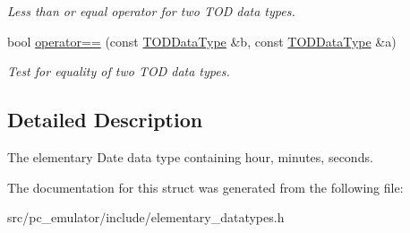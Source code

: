 \begin{DoxyCompactItemize}
\begin{DoxyCompactList}\small\item\em Less than or equal operator for two T\+OD data types. \end{DoxyCompactList}\item 
bool \hyperlink{structpc__emulator_1_1TODDataType_a5ed371ac41a465b795dfc20e05550a64}{operator==} (const \hyperlink{structpc__emulator_1_1TODDataType}{T\+O\+D\+Data\+Type} \&b, const \hyperlink{structpc__emulator_1_1TODDataType}{T\+O\+D\+Data\+Type} \&a)\hypertarget{structpc__emulator_1_1TODDataType_a5ed371ac41a465b795dfc20e05550a64}{}\label{structpc__emulator_1_1TODDataType_a5ed371ac41a465b795dfc20e05550a64}

\begin{DoxyCompactList}\small\item\em Test for equality of two T\+OD data types. \end{DoxyCompactList}\end{DoxyCompactItemize}


\subsection{Detailed Description}
The elementary Date data type containing hour, minutes, seconds. 

The documentation for this struct was generated from the following file\+:\begin{DoxyCompactItemize}
\item 
src/pc\+\_\+emulator/include/elementary\+\_\+datatypes.\+h\end{DoxyCompactItemize}
